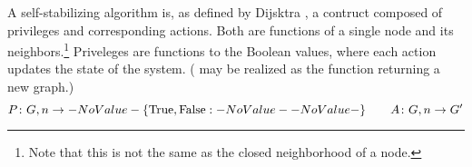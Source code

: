 A self-stabilizing algorithm is, as defined by
  Dijsktra \autocite{Dijkstra:1974:SSS:361179.361202},
  a contruct composed of \glspl{privilege} and corresponding \glspl{action}.
Both are functions of a single node and its neighbors.\footnote{%
  Note that this is not the same as the closed neighborhood of a node.}
Priveleges are functions to the Boolean values,
  where each action updates the state of the system.
( may be realized as the function returning a new graph.)
\[
\Function[P]{G, n}{\SetBoolean}
\qquad
\Function[A]{G, n}{G^\prime}
\]

